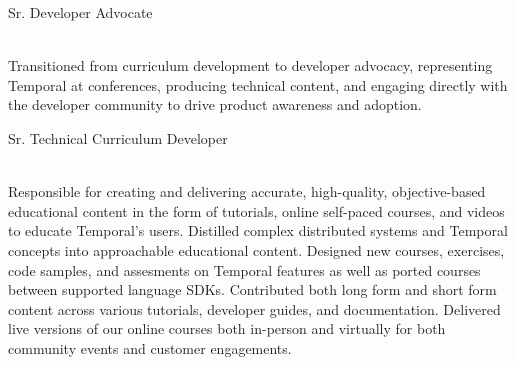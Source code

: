 \documentclass[10pt]{article} %
\begin{document}
\begin{minipage}[t]{0.5\textwidth}
{\raggedright\large Sr. Developer Advocate} \\
\normalsize{
    Transitioned from curriculum development to developer advocacy, representing Temporal at conferences, producing technical content, and engaging directly with the developer community to drive product awareness and adoption.
} \\

{\raggedright\large Sr. Technical Curriculum Developer} \\
\normalsize{
    Responsible for creating and delivering accurate, high-quality, objective-based educational content in the form of tutorials, online self-paced courses, and videos to educate Temporal's users. Distilled complex distributed systems and Temporal concepts into approachable educational content. Designed new courses, exercises, code samples, and assesments on Temporal features as well as ported courses between supported language SDKs. Contributed both long form and short form content across various tutorials, developer guides, and documentation. Delivered live versions of our online courses both in-person and virtually for both community events and customer engagements.
} \\

\end{minipage} %
\hfill
\end{document}
